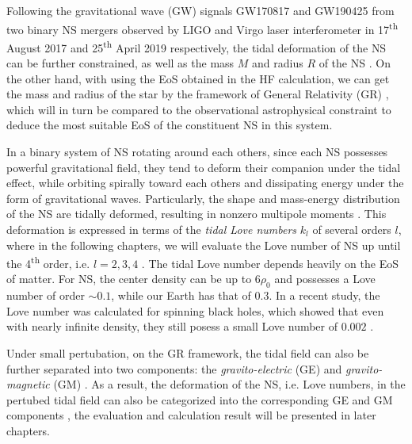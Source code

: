 Following the gravitational wave (\gls{GW}) signals GW170817\cite{abbott2017gw170817} and GW190425\cite{abbott2020gw190425} from two binary \gls{NS} mergers observed by LIGO and Virgo laser interferometer in 17\textsuperscript{th} August 2017 and 25\textsuperscript{th} April 2019 respectively, the tidal deformation of the \gls{NS} can be further constrained, as well as the mass $M$ and radius $R$ of the \gls{NS} \cite{abbott2018gw170817}. On the other hand, with using the \gls{EoS} obtained in the \gls{HF} calculation, we can get the mass and radius of the star by the framework of General Relativity (\gls{GR}) \cite{tan2020spin,tan2021equation}, which will in turn be compared to the observational astrophysical constraint to deduce the most suitable \gls{EoS} of the constituent \gls{NS} in this system.\par
In a binary system of \gls{NS} rotating around each others, since each \gls{NS} possesses powerful gravitational field, they tend to deform their companion under the tidal effect, while orbiting spirally toward each others and dissipating energy under the form of gravitational waves. Particularly, the shape and mass-energy distribution of the \gls{NS} are tidally deformed, resulting in nonzero multipole moments \cite{hinderer2008tidal,hinderer2010tidal,damour2009relativistic}. This deformation is expressed in terms of the \emph{tidal Love numbers} $k_l$ of several orders $l$, where in the following chapters, we will evaluate the Love number of \gls{NS} up until the 4\textsuperscript{th} order, i.e. $l=2,3,4$ \cite{perot2021role}. The tidal Love number depends heavily on the \gls{EoS} of matter. For \gls{NS}, the center density can be up to $6\rho_0$ and possesses a Love number of order $\sim 0.1$, while our Earth has that of $0.3$. In a recent study, the Love number was calculated for spinning black holes, which showed that even with nearly infinite density, they still posess a small Love number of $0.002$ \cite{le2021spinning}.\par
Under small pertubation, on the \gls{GR} framework, the tidal field can also be further separated into two components: the \emph{gravito-electric} (\gls{GE}) and \emph{gravito-magnetic} (\gls{GM}) \cite{damour2009relativistic}. As a result, the deformation of the \gls{NS}, i.e. Love numbers, in the pertubed tidal field can also be categorized into the corresponding \gls{GE} and \gls{GM} components \cite{perot2021role}, the evaluation and calculation result will be presented in later chapters.

